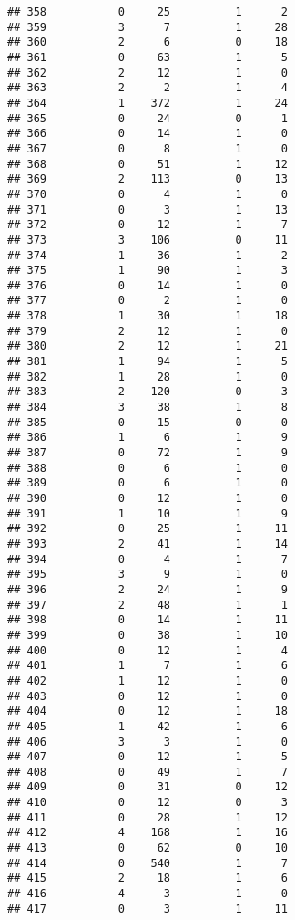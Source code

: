 \documentclass[]{article}
\begin{document}
\begin{verbatim}
## 358           0     25          1      2
## 359           3      7          1     28
## 360           2      6          0     18
## 361           0     63          1      5
## 362           2     12          1      0
## 363           2      2          1      4
## 364           1    372          1     24
## 365           0     24          0      1
## 366           0     14          1      0
## 367           0      8          1      0
## 368           0     51          1     12
## 369           2    113          0     13
## 370           0      4          1      0
## 371           0      3          1     13
## 372           0     12          1      7
## 373           3    106          0     11
## 374           1     36          1      2
## 375           1     90          1      3
## 376           0     14          1      0
## 377           0      2          1      0
## 378           1     30          1     18
## 379           2     12          1      0
## 380           2     12          1     21
## 381           1     94          1      5
## 382           1     28          1      0
## 383           2    120          0      3
## 384           3     38          1      8
## 385           0     15          0      0
## 386           1      6          1      9
## 387           0     72          1      9
## 388           0      6          1      0
## 389           0      6          1      0
## 390           0     12          1      0
## 391           1     10          1      9
## 392           0     25          1     11
## 393           2     41          1     14
## 394           0      4          1      7
## 395           3      9          1      0
## 396           2     24          1      9
## 397           2     48          1      1
## 398           0     14          1     11
## 399           0     38          1     10
## 400           0     12          1      4
## 401           1      7          1      6
## 402           1     12          1      0
## 403           0     12          1      0
## 404           0     12          1     18
## 405           1     42          1      6
## 406           3      3          1      0
## 407           0     12          1      5
## 408           0     49          1      7
## 409           0     31          0     12
## 410           0     12          0      3
## 411           0     28          1     12
## 412           4    168          1     16
## 413           0     62          0     10
## 414           0    540          1      7
## 415           2     18          1      6
## 416           4      3          1      0
## 417           0      3          1     11

\end{verbatim}
\end{document}
